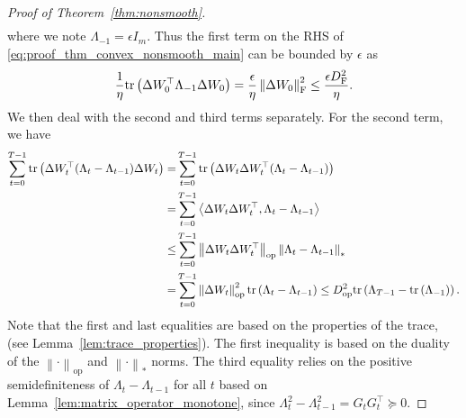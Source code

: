 \documentclass{article}
\theoremstyle{remark}
\newcommand{\Norm}[1]{\left\|#1\right\|}
\newcommand{\dotprod}[2]{\left\langle#1,#2\right\rangle}
\newcommand{\tr}[1]{{\rm tr}\left( #1 \right)}
\newcommand{\tW}{\Delta W}
\begin{document}
\begin{proof}[Proof of Theorem~\ref{thm:nonsmooth}]
\begin{align}
\end{align}
where we note $\Lambda_{-1} = \epsilon I_m$. Thus the first term on the RHS of \eqref{eq:proof_thm_convex_nonsmooth_main} can be bounded by $\epsilon$ as
\begin{align}\label{eq:proof_thm_convex_nonsmooth_term_epsilon}
    \frac{1}{\eta} \tr{\tW_0^\top \Lambda_{-1} \tW_0} = \frac{\epsilon}{\eta} \Norm{\tW_0}_{\mathrm{F}}^2 \le \frac{\epsilon D_{\mathrm{F}}^2}{\eta} .
\end{align}
We then deal with the second and third terms separately. For the second term, we have
\begin{align}\label{eq:proof_thm_convex_nonsmooth_term_weight}
\begin{split}
    \sum_{t=0}^{T-1} \tr{\tW_{t}^\top (\Lambda_t - \Lambda_{t-1}) \tW_{t} } =& \sum_{t=0}^{T-1} \tr{\tW_{t} \tW_{t}^\top (\Lambda_t - \Lambda_{t-1}) } \\
    =& \sum_{t=0}^{T-1} \dotprod{\tW_t \tW_t^\top}{\Lambda_t - \Lambda_{t-1}} \\
    \le&
    \sum_{t=0}^{T-1} \Norm{\tW_t \tW_t^\top}_{\mathrm{op}} \Norm{\Lambda_t - \Lambda_{t-1}}_* \\
    =&
    \sum_{t=0}^{T-1} \Norm{\tW_t}_{\mathrm{op}}^2 \tr{\Lambda_t - \Lambda_{t-1}}
    \le
    D_{\mathrm{op}}^2 \tr{\Lambda_{T-1} - \tr{\Lambda_{-1}}}.
\end{split}
\end{align}
Note that the first and last equalities are based on the properties of the trace, (see Lemma~\ref{lem:trace_properties}). The first inequality is based on the duality of the $\Norm{\cdot}_{\mathrm{op}}$ and $\Norm{\cdot}_*$ norms. The third equality relies on the positive semidefiniteness of $\Lambda_t - \Lambda_{t-1}$ for all $t$ based on Lemma~\ref{lem:matrix_operator_monotone}, since $\Lambda_t^2 - \Lambda_{t-1}^2 = G_tG_t^\top \succeq 0$.


\end{proof}
\end{document}
